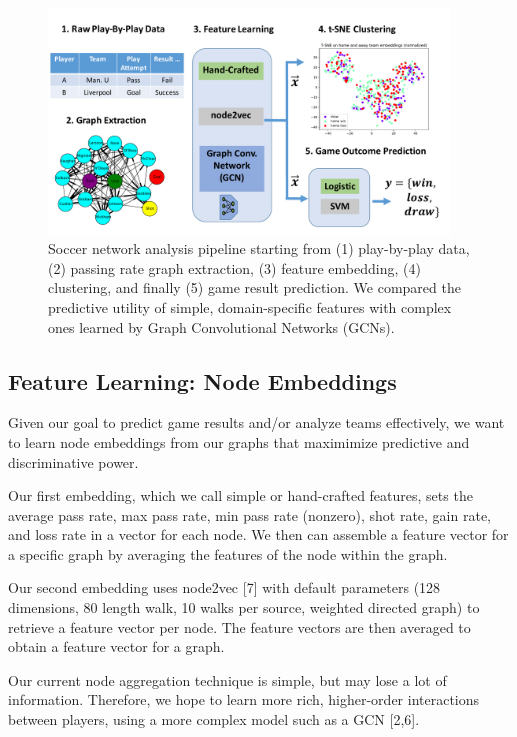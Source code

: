 \begin{figure}[h]
  \centering
  \includegraphics[width=0.95\textwidth]{plots/soccer_block_diagram.pdf}
  \caption{Soccer network analysis pipeline starting from (1) play-by-play data, (2) passing rate graph extraction, (3) feature embedding, (4) clustering, and finally (5) game result prediction. We compared the predictive utility of simple, domain-specific features with complex ones learned by Graph Convolutional Networks (GCNs).}
  \label{fig:block_diagram}
\end{figure}

\subsection{Feature Learning: Node Embeddings}
Given our goal to predict game results and/or analyze teams effectively, we want to learn node embeddings from our graphs that maximimize predictive and discriminative power.

Our first embedding, which we call simple or hand-crafted features, sets the average pass rate, max pass rate, min pass rate (nonzero), shot rate, gain rate, and loss rate in a vector for each node. We then can assemble a feature vector for a specific graph by averaging the features of the node within the graph. 

Our second embedding uses node2vec [7] with default parameters (128 dimensions, 80 length walk, 10 walks per source, weighted directed graph) to retrieve a feature vector per node. The feature vectors are then averaged to obtain a feature vector for a graph. 

Our current node aggregation technique is simple, but may lose a lot of information. 
Therefore, we hope to learn more rich, higher-order interactions between players, using a more complex model such as a  GCN [2,6].

